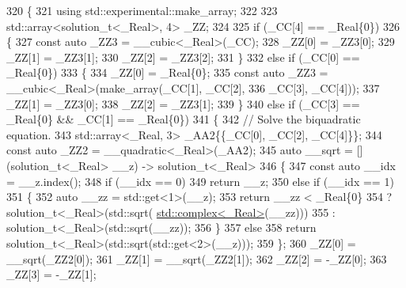 \begin{DoxyCode}
320     \{
321       \textcolor{keyword}{using} std::experimental::make\_array;
322 
323       std::array<solution\_t<\_Real>, 4> \_ZZ;
324 
325       \textcolor{keywordflow}{if} (\_CC[4] == \_Real\{0\})
326         \{
327           \textcolor{keyword}{const} \textcolor{keyword}{auto} \_ZZ3 = \_\_cubic<\_Real>(\_CC);
328           \_ZZ[0] = \_ZZ3[0];
329           \_ZZ[1] = \_ZZ3[1];
330           \_ZZ[2] = \_ZZ3[2];
331         \}
332       \textcolor{keywordflow}{else} \textcolor{keywordflow}{if} (\_CC[0] == \_Real\{0\})
333         \{
334           \_ZZ[0] = \_Real\{0\};
335           \textcolor{keyword}{const} \textcolor{keyword}{auto} \_ZZ3 = \_\_cubic<\_Real>(make\_array(\_CC[1], \_CC[2],
336                                                       \_CC[3], \_CC[4]));
337           \_ZZ[1] = \_ZZ3[0];
338           \_ZZ[2] = \_ZZ3[1];
339         \}
340       \textcolor{keywordflow}{else} \textcolor{keywordflow}{if} (\_CC[3] == \_Real\{0\} && \_CC[1] == \_Real\{0\})
341         \{
342           \textcolor{comment}{// Solve the biquadratic equation.}
343           std::array<\_Real, 3> \_AA2\{\{\_CC[0], \_CC[2], \_CC[4]\}\};
344           \textcolor{keyword}{const} \textcolor{keyword}{auto} \_ZZ2 = \_\_quadratic<\_Real>(\_AA2);
345           \textcolor{keyword}{auto} \_\_sqrt = [](solution\_t<\_Real> \_\_z) -> solution\_t<\_Real>
346                         \{
347                           \textcolor{keyword}{const} \textcolor{keyword}{auto} \_\_idx = \_\_z.index();
348                           \textcolor{keywordflow}{if} (\_\_idx == 0)
349                             \textcolor{keywordflow}{return} \_\_z;
350                           \textcolor{keywordflow}{else} \textcolor{keywordflow}{if} (\_\_idx == 1)
351                             \{
352                               \textcolor{keyword}{auto} \_\_zz = std::get<1>(\_\_z);
353                               \textcolor{keywordflow}{return} \_\_zz < \_Real\{0\}
354                                    ? solution\_t<\_Real>(std::sqrt(
      \hyperlink{classstd_1_1complex}{std::complex<\_Real>}(\_\_zz)))
355                                    : solution\_t<\_Real>(std::sqrt(\_\_zz));
356                             \}
357                           \textcolor{keywordflow}{else}
358                             \textcolor{keywordflow}{return} solution\_t<\_Real>(std::sqrt(std::get<2>(\_\_z)));
359                         \};
360           \_ZZ[0] = \_\_sqrt(\_ZZ2[0]);
361           \_ZZ[1] = \_\_sqrt(\_ZZ2[1]);
362           \_ZZ[2] = -\_ZZ[0];
363           \_ZZ[3] = -\_ZZ[1];

\end{DoxyCode}
